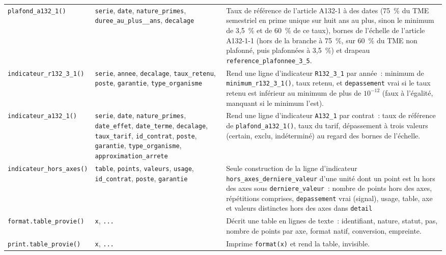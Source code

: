 \documentclass[a4paper,11pt]{article}
\newcommand{\fsp}{\unskip\nobreak\hskip .5\fontdimen2\font\relax}
\newcommand{\code}[1]{\texttt{\small #1}}
\begin{document}
{\begin{longtable}{@{}p{5.6cm}>{\raggedright\arraybackslash}p{3.0cm}p{6.5cm}@{}}
\code{plafond\_a132\_1()} & \code{serie}, \code{date}, \code{nature\_primes}, \code{duree\_au\_plus\_\allowbreak 8\_ans}, \code{decalage} & Taux de référence de l'article A132-1 à des dates (75~\% du TME semestriel en prime unique sur huit ans au plus, sinon le minimum de 3,5~\% et de 60~\% de ce taux), bornes de l'échelle de l'article A132-1-1 (hors de la branche à 75~\%, sur 60~\% du TME non plafonné, puis plafonnées à 3,5~\%) et drapeau \code{reference\_plafonnee\_3\_5}. \\
\code{indicateur\_r132\_3\_1()} & \code{serie}, \code{annee}, \code{decalage}, \code{taux\_retenu}, \code{poste}, \code{garantie}, \code{type\_organisme} & Rend une ligne d'indicateur \code{R132\_3\_1} par année~: minimum de \code{minimum\_r132\_3\_1()}, taux retenu, et \code{depassement} vrai si le taux retenu est inférieur au minimum de plus de $10^{-12}$ (faux à l'égalité, manquant si le minimum l'est). \\
\code{indicateur\_a132\_1()} & \code{serie}, \code{date}, \code{nature\_primes}, \code{date\_effet}, \code{date\_terme}, \code{decalage}, \code{taux\_tarif}, \code{id\_contrat}, \code{poste}, \code{garantie}, \code{type\_organisme}, \code{approximation\_\allowbreak arrete} & Rend une ligne d'indicateur \code{A132\_1} par contrat~: taux de référence de \code{plafond\_a132\_1()}, taux du tarif, dépassement à trois valeurs (certain, exclu, indéterminé) au regard des bornes de l'échelle. \\
\code{indicateur\_hors\_axes()} & \code{table}, \code{points}, \code{valeurs}, \code{usage}, \code{id\_contrat}, \code{poste}, \code{garantie} & Seule construction de la ligne d'indicateur \code{hors\_axes\_derniere\_valeur} d'une unité dont un point est lu hors des axes sous \code{derniere\_valeur}~: nombre de points hors des axes, répétitions comprises, \code{depassement} vrai (signal), usage, table, axe et valeurs distinctes hors des axes dans \code{detail}\fsp; aucune ligne sans point hors des axes\fsp; table à un axe seulement. \\
\code{format.table\_provie()} & \code{x}, \code{...} & Décrit une table en lignes de texte~: identifiant, nature, statut, pas, nombre de points par axe, format natif, conversion, empreinte. \\
\code{print.table\_provie()} & \code{x}, \code{...} & Imprime \code{format(x)} et rend la table, invisible. \\
\end{longtable}
}

\end{document}
